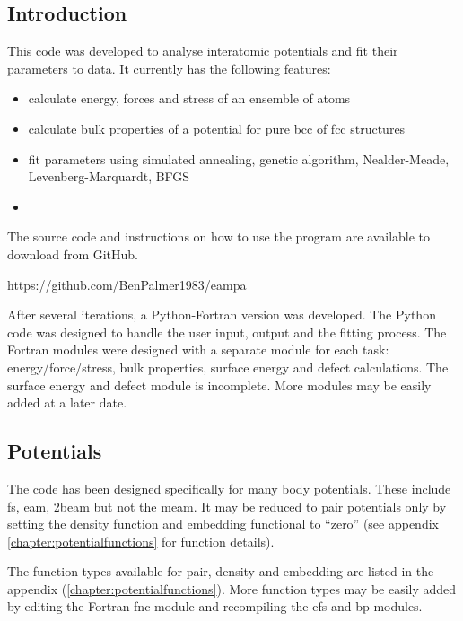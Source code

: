 \subsection{Introduction}

This code was developed to analyse interatomic potentials and fit their parameters to data.  It currently has the following features:

\begin{itemize}
\item calculate energy, forces and stress of an ensemble of atoms 
\item calculate bulk properties of a potential for pure \acrshort{bcc} of \acrshort{fcc} structures
\item fit parameters using simulated annealing, genetic algorithm, Nealder-Meade, Levenberg-Marquardt, BFGS
\item  
\end{itemize}

The source code and instructions on how to use the program are available to download from GitHub.

https://github.com/BenPalmer1983/eampa

After several iterations, a Python-Fortran version was developed.  The Python code was designed to handle the user input, output and the fitting process.  The Fortran modules were designed with a separate module for each task: energy/force/stress, bulk properties, surface energy and defect calculations.  The surface energy and defect module is incomplete.  More modules may be easily added at a later date.




\subsection{Potentials}

The code has been designed specifically for many body potentials.  These include \acrlong{fs},  \acrlong{eam}, \acrlong{2beam} but not the \acrlong{meam}.  It may be reduced to pair potentials only by setting the density function and embedding functional to \enquote{zero} (see appendix \ref{chapter:potentialfunctions} for function details).  

The function types available for pair, density and embedding are listed in the appendix (\ref{chapter:potentialfunctions}).  More function types may be easily added by editing the Fortran fnc module and recompiling the efs and bp modules.

